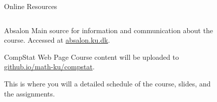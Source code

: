 \documentclass[
  ignorenonframetext,
  aspectratio=1610,
  onlytextwidth]{beamer}
\begin{document}
\begin{frame}{Online Resources}
\label{online-resources}
\begin{columns}[T]
\begin{column}{0.7\linewidth}
\begin{block}{Absalon}
\label{absalon}
Main source for information and communication about the course. Accessed
at \href{https://absalon.ku.dk/}{absalon.ku.dk}.

\pause
\end{block}

\begin{block}{CompStat Web Page}
\label{compstat-web-page}
Course content will be uploaded to
\href{https://math-ku.github.io/compstat/}{github.io/math-ku/compstat}.

\medskip

This is where you will a detailed schedule of the course, slides, and
the assignments.
\end{block}
\end{column}

\begin{column}{0.25\linewidth}
\begin{figure}[H]


\end{figure}
\end{column}
\end{columns}
\end{frame}
\end{document}
